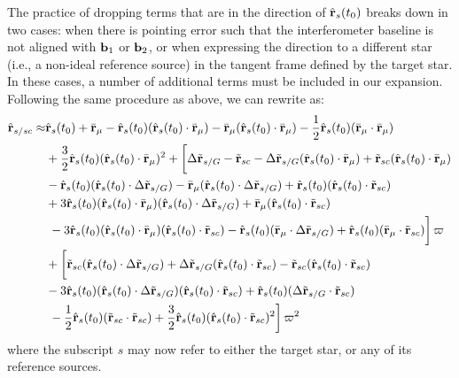 The practice of dropping terms that are in the direction of $\hat{\mathbf{r}}_s(t_0)$ breaks down in two cases: when there is pointing error such that the interferometer baseline is not aligned with $\mathbf b_1$ or $\mathbf b_2$, or when expressing the direction to a different star (i.e., a non-ideal reference source) in the tangent frame defined by the target star.  In these cases, a number of additional terms must be included in our expansion.  Following the same procedure as above, we can rewrite  as:
\begin{equation}\label{eq:rhat_expand2_perr}
\begin{split}
\hat\R_{s/sc} \approx&
\hat\R_s(t_0) + \bar\R_\mu - \hat\R_s(t_0) (\hat\R_s(t_0) \cdot \bar\R_\mu) - \bar\R_\mu (\hat\R_s(t_0) \cdot \bar\R_\mu) -  \frac{1}{2} \hat\R_s(t_0)(\bar\R_\mu \cdot \bar\R_\mu)\\
&{} + \frac{3}{2} \hat\R_s(t_0)(\hat\R_s(t_0) \cdot \bar\R_\mu)^2  + \left[\vphantom{\frac{1}{2}}\Delta \tilde\R_{s/G} - \tilde\R_{sc} - \Delta \tilde\R_{s/G} (\hat\R_s(t_0) \cdot \bar\R_\mu) + \tilde\R_{sc} (\hat\R_s(t_0) \cdot \bar\R_\mu) \right.\\
&{}  - \hat\R_s(t_0) (\hat\R_s(t_0) \cdot \Delta \tilde\R_{s/G}) - \bar\R_\mu (\hat\R_s(t_0) \cdot \Delta \tilde\R_{s/G}) + \hat\R_s(t_0) (\hat\R_s(t_0) \cdot \tilde\R_{sc})\\
&{} + 3\hat\R_s(t_0) (\hat\R_s(t_0) \cdot \bar\R_\mu) (\hat\R_s(t_0) \cdot \Delta \tilde\R_{s/G}) + \bar\R_\mu (\hat\R_s(t_0) \cdot \tilde\R_{sc}) \\
&\left.{}  - 3\hat\R_s(t_0) (\hat\R_s(t_0) \cdot \bar\R_\mu) (\hat\R_s(t_0) \cdot \tilde\R_{sc}) - \hat\R_s(t_0) (\bar\R_\mu \cdot \Delta \tilde\R_{s/G}) + \hat\R_s(t_0) (\bar\R_\mu \cdot \tilde\R_{sc})\vphantom{\frac{1}{2}}\right] \varpi  \\
&{}+ \left[\vphantom{\frac{1}{2}}\tilde\R_{sc} (\hat\R_s(t_0) \cdot \Delta \tilde\R_{s/G}) + \Delta \tilde\R_{s/G} (\hat\R_s(t_0) \cdot \tilde\R_{sc}) - \tilde\R_{sc} (\hat\R_s(t_0) \cdot \tilde\R_{sc})\right.\\
&{} - 3\hat\R_s(t_0) (\hat\R_s(t_0) \cdot \Delta \tilde\R_{s/G}) (\hat\R_s(t_0) \cdot \tilde\R_{sc}) + \hat\R_s(t_0) (\Delta \tilde\R_{s/G} \cdot \tilde\R_{sc})\\
&\left.{} - \frac{1}{2} \hat\R_s(t_0)(\tilde\R_{sc} \cdot \tilde\R_{sc})  + \frac{3}{2} \hat\R_s(t_0)(\hat\R_s(t_0) \cdot \tilde\R_{sc})^2\right] \varpi^2
\end{split}
\end{equation}
where the subscript $s$ may now refer to either the target star, or any of its reference sources.

